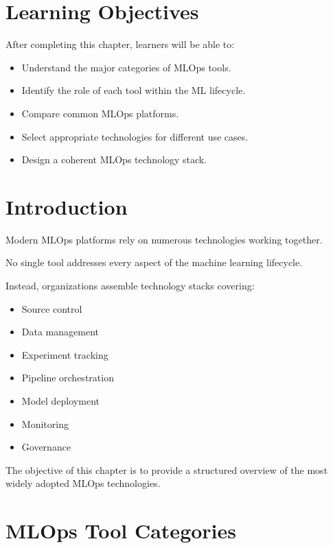 
\label{chap:mlops-tooling}

\section{Learning Objectives}

After completing this chapter, learners will be able to:

\begin{itemize}
    \item Understand the major categories of MLOps tools.
    \item Identify the role of each tool within the ML lifecycle.
    \item Compare common MLOps platforms.
    \item Select appropriate technologies for different use cases.
    \item Design a coherent MLOps technology stack.
\end{itemize}

\section{Introduction}

Modern MLOps platforms rely on numerous technologies working together.

No single tool addresses every aspect of the machine learning lifecycle.

Instead, organizations assemble technology stacks covering:

\begin{itemize}
    \item Source control
    \item Data management
    \item Experiment tracking
    \item Pipeline orchestration
    \item Model deployment
    \item Monitoring
    \item Governance
\end{itemize}

The objective of this chapter is to provide a structured overview of the most widely adopted MLOps technologies.

\section{MLOps Tool Categories}

